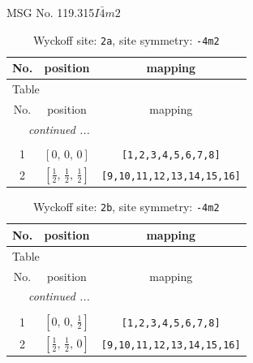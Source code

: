 \documentclass[fleqn,8pt]{jsarticle}
\begin{document}
\setcounter{MaxMatrixCols}{32}

\renewcommand{\tablename}{Table~}
\renewcommand{\figurename}{Figure~}
\begin{center}
\LARGE
MSG No. 119.315\quad$I\bar{4}m2$
\end{center}
\renewcommand{\arraystretch}{1.2}
\begin{longtable}{ccc}
\caption{Wyckoff site: {\tt 2a}, site symmetry: {\tt -4m2}}
 \\
 \hline \hline
No. & position & mapping \\ \hline \endfirsthead

\multicolumn{2}{l}{\tablename\ \thetable{}} \\
 \hline \hline
No. & position & mapping \\ \hline \endhead

 \hline \hline
\multicolumn{2}{r}{\footnotesize\it continued ...} \\ \endfoot

 \hline \hline
\multicolumn{2}{r}{} \\ \endlastfoot

1 & $\left[ 0,\, 0,\, 0 \right]$ & {\tt [1,2,3,4,5,6,7,8]} \\ \hline
2 & $\left[ \frac{1}{2},\, \frac{1}{2},\, \frac{1}{2} \right]$ & {\tt [9,10,11,12,13,14,15,16]} \\
\end{longtable}
\renewcommand{\arraystretch}{1.2}
\begin{longtable}{ccc}
\caption{Wyckoff site: {\tt 2b}, site symmetry: {\tt -4m2}}
 \\
 \hline \hline
No. & position & mapping \\ \hline \endfirsthead

\multicolumn{2}{l}{\tablename\ \thetable{}} \\
 \hline \hline
No. & position & mapping \\ \hline \endhead

 \hline \hline
\multicolumn{2}{r}{\footnotesize\it continued ...} \\ \endfoot

 \hline \hline
\multicolumn{2}{r}{} \\ \endlastfoot

1 & $\left[ 0,\, 0,\, \frac{1}{2} \right]$ & {\tt [1,2,3,4,5,6,7,8]} \\ \hline
2 & $\left[ \frac{1}{2},\, \frac{1}{2},\, 0 \right]$ & {\tt [9,10,11,12,13,14,15,16]} \\
\end{longtable}
\end{document}
